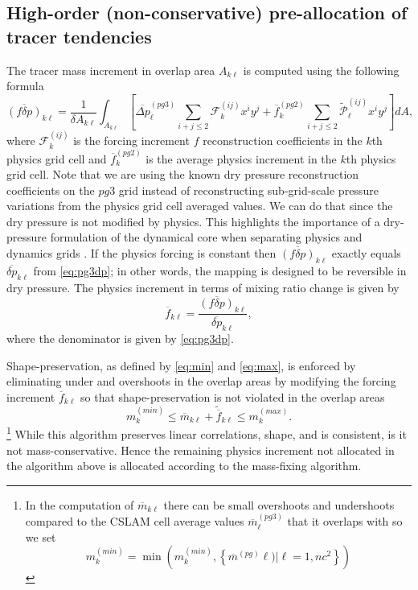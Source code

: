 

\subsection{High-order (non-conservative) pre-allocation of tracer tendencies}
The tracer mass increment in overlap area $A_{k\ell}$ is computed using the following formula
\begin{equation}
\label{eq:mp3}
\overline{\left( f\delta p\right)}_{k\ell}=\frac{1}{\delta A_{k\ell}}\int_{A_{k\ell}}\left[ \overline{\Delta p}_\ell^{(pg3)}\sum_{i+j\le 2}{\mathcal{F}}^{(ij)}_k x^{i}y^{j}+{\overline{f}}_k^{(pg2)}\sum_{i+j\le 2}{\widetilde{{\mathcal{P}}}}^{(ij)}_\ell x^{i}y^{j}\right] dA,
\end{equation}
where $\mathcal{F}^{(ij)}_k$ is the forcing increment $f$ reconstruction coefficients in the $k$th physics grid cell and ${\overline{f}}_k^{(pg2)}$ is the average physics increment in the $k$th physics grid cell. Note that we are using the known dry pressure reconstruction coefficients on the $pg3$ grid instead of reconstructing sub-grid-scale pressure variations from the physics grid cell averaged values. We can do that since the dry pressure is not modified by physics. This highlights the importance of a dry-pressure formulation of the dynamical core when separating physics and dynamics grids \citep{LetAl2018JAMES}. If the physics forcing is constant then $\overline{\left( f\delta p\right)}_{k\ell}$ exactly equals $\overline{\delta p}_{k\ell}$ from \eqref{eq:pg3dp}; in other words, the mapping is designed to be reversible in dry pressure. The physics increment in terms of mixing ratio change is given by
\begin{equation}
\label{eq:pg3fq}
\overline{f}_{k\ell}=\frac{\overline{\left( f\delta p\right)}_{k\ell}}{\overline{\delta p}_{k\ell}},
\end{equation}
where the denominator is given by \eqref{eq:pg3dp}.

Shape-preservation, as defined by \eqref{eq:min} and \eqref{eq:max}, is enforced by eliminating under and overshoots in the overlap areas by modifying the forcing increment $\overline{f}_{k\ell}$ so that shape-preservation is not violated in the overlap areas
\begin{equation}
m_k^{(min)} \le \overline{m}_{k\ell}+\widetilde{\overline{f}}_{k\ell} \le m_k^{(max)} .
\end{equation}
{\footnote{In the computation of $\overline{m}_{k\ell}$ there can be small overshoots and undershoots compared to the CSLAM cell average values $\overline{m}^{(pg3)}_\ell$ that it overlaps with so we set
\begin{equation}
m_k^{(min)}=\min \left( m_k^{(min)},\left\{ \overline{m}^{(pg)}\ell)|\ell=1,nc^2\right\} \right)
\end{equation}}}
While this algorithm preserves linear correlations, shape, and is consistent, is it not mass-conservative. Hence the remaining physics increment not allocated in the algorithm above is allocated according to the mass-fixing algorithm.

